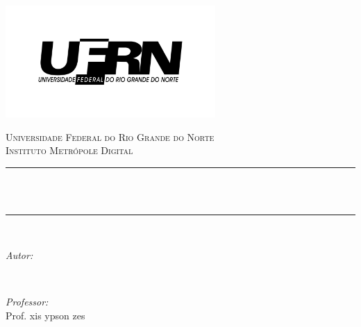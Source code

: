 \begin{titlepage}

\newcommand{\HRule}{\rule{\linewidth}{0.5mm}} %

\center
\includegraphics[width=8cm]{title/logo.png}\\[2cm]
 

\center %


\textsc{\LARGE Universidade Federal do Rio Grande do Norte}\\[0.5cm] %
\textsc{\large Instituto Metrópole Digital}\\[0.5cm] %

\makeatletter
\HRule \\[0.4cm]
{ \huge \bfseries \@title}\\[0.4cm] %
\HRule \\[1.5cm]
 

\begin{minipage}{0.4\textwidth}
\begin{flushleft} \large
\emph{Autor:}\\
\@author %
\end{flushleft}
\end{minipage}
~
\begin{minipage}{0.4\textwidth}
\begin{flushright} \large
\emph{Professor:} \\
Prof. xis ypson zes \\[1.2em] %
\end{flushright}
\end{minipage}\\[10cm]
\makeatother


\end{titlepage}
